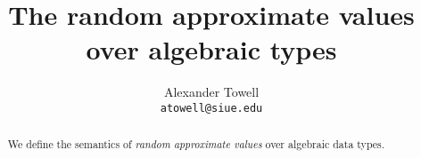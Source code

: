 \documentclass[11pt,final,hidelinks]{article}
\title
{
    The random approximate values over algebraic types
}
\author
{
    Alexander Towell\\
    \texttt{atowell@siue.edu}
}
\date{}
\begin{document}
\maketitle
\begin{abstract}
We define the semantics of \emph{random approximate values} over algebraic data types.
\end{abstract}

\tableofcontents










\end{document}
